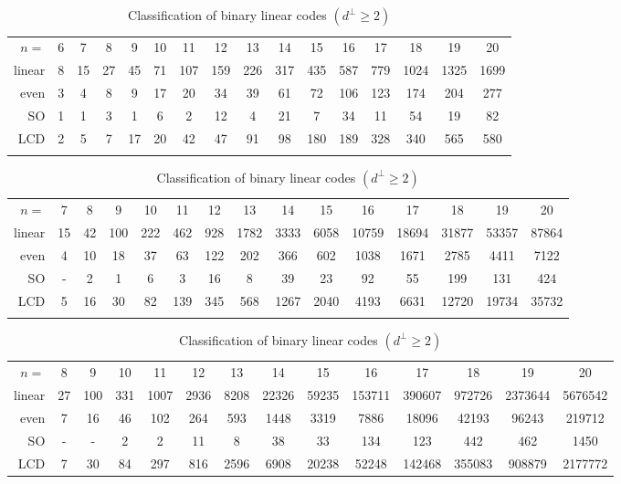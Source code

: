 \documentclass[a4paper,11pt]{article}
\begin{document}
\begin{table}
\caption{Classification of binary linear codes $(d^\perp\ge 2)$\label{table2}}
{\footnotesize
\begin{tabular}{r|c|c|c|c|c|c|c|c|c|c|c|c|c|c|c}
\hline\noalign{\smallskip}
\multicolumn{16}{c}{$k=3$} \\
\hline
$n=$    & 6 & 7 & 8 & 9 & 10& 11 &  12& 13& 14& 15& 16& 17& 18& 19& 20 \\
\hline
linear  & 8 & 15& 27& 45& 71& 107& 159&	226&	317&	435&587&	779&1024&1325&1699\\
even    & 3 &  4&  8&  9& 17&  20&	34&	39&	61&	72&	106&	123&	174&	204&	277\\
SO      & 1 &  1&  3&  1&  6&   2&	12&	4&	21&	7&	34&	11&	54&	19&	82\\
LCD     & 2 &  5&  7& 17& 20&  42&	47&	91&	98&	180&	189&	328&	340&	565&	580\\
\noalign{\smallskip}\hline
\end{tabular}
\begin{tabular}{r|c|c|c|c|c|c|c|c|c|c|c|c|c|c}
\hline\noalign{\smallskip}
\multicolumn{15}{c}{$k=4$} \\
\hline
$n=$    & 7 & 8 & 9 & 10& 11 &  12& 13& 14& 15& 16& 17& 18& 19& 20 \\
\hline
linear  & 15& 42& 100&	222&	462&	928&	1782&	3333&	6058&	10759&	18694&	31877&	53357&	87864\\
even    &  4& 10&  18&	37&	63&	122&	202&	366&	602&	1038&	1671&	2785&	4411&	7122\\
SO      &  -&  2&   1&	6&	3&	16&	8&	39&	23&	92&	55&	199&	131&	424\\
LCD     &  5& 16&  30&	82&	139&	345&	568&	1267&	2040&	4193&	6631&	12720&	19734&	35732\\
\noalign{\smallskip}\hline
\end{tabular}
\begin{tabular}{r|c|c|c|c|c|c|c|c|c|c|c|c|c}
\hline\noalign{\smallskip}
\multicolumn{14}{c}{$k=5$} \\
\hline
$n=$    &  8 & 9 & 10& 11 &  12& 13& 14& 15& 16& 17& 18& 19& 20 \\
\hline
linear  & 	27&	100&	331&	1007&	2936&	8208&	22326&	59235&	153711&	390607&	972726&	2373644&	5676542\\
even    &  	7&	16&	46&	102&	264&	593&	1448&	3319&	7886&	18096&	42193&	96243&	219712\\
SO      &  	-&	-&	2&	2	&11&	8&	38&	33&	134&	123&	442&	462&	1450\\
LCD     &  	7&	30&	84&	297&	816&	2596&	6908&	20238&	52248&	142468&	355083&	908879&	2177772\\

\end{tabular}}
\end{table}
\end{document}
